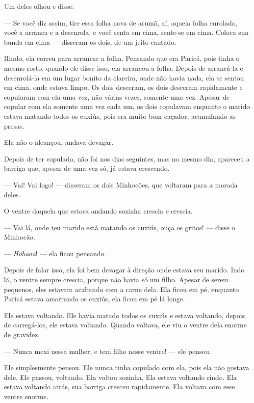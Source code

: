 Um deles olhou e disse: 

--- Se você diz assim, tire essa folha nova de arumã, aí, aquela folha
enrolada, você a arranca e a desenrola, e você senta em cima, sente-se
em cima. Coloca sua bunda em cima --- disseram os dois, de um jeito
cantado. 

Rindo, ela correu para arrancar a folha. Pensando que era Paricá, pois
 tinha o mesmo rosto, quando ele disse isso, ela arrancou a folha. Depois
 de arrancá-la e desenrolá-la em um lugar bonito da clareira, onde não
 havia nada, ela se sentou em cima, onde estava limpo. Os dois desceram,
 os dois desceram rapidamente e copularam com ela uma vez, não várias
 vezes, somente uma vez. Apesar de copular com ela somente uma vez cada um, os dois copulavam enquanto o marido estava matando todos os cuxiús,
 pois era muito bom caçador, acumulando as presas. 

Ela não o alcançou, andava devagar. 

Depois de ter copulado, não foi nos dias seguintes, mas no mesmo dia,
 apareceu a barriga que, apesar de uma vez só, já estava crescendo. 

--- Vai! Vai logo! --- disseram os dois Minhocões, que voltaram para a
morada deles. 

O ventre daquela que estava andando sozinha crescia e crescia. 

--- Vai lá, onde teu marido está matando os cuxiús, ouça os gritos! ---
disse o Minhocão. 

--- \textit{Hõhaaa}! --- ela ficou pensando.

Depois de falar isso, ela foi bem devagar à direção onde estava seu
marido. Indo lá, o ventre sempre crescia, porque não havia só um filho.
Apesar de serem pequenos, eles estavam acabando com a carne dela. Ela
ficou em pé, enquanto Paricá estava amarrando os cuxiús, ela ficou em pé
lá longe. 

Ele estava voltando. Ele havia matado todos os cuxiús e estava voltando,
depois de carregá-los, ele estava voltando. Quando voltava, ele viu o
ventre dela enorme de gravidez. 

--- Nunca mexi nessa mulher, e tem filho nesse ventre! --- ele pensou.

Ele simplesmente pensou. Ele nunca tinha copulado com ela, pois ela não
 gostava dele. Ele passou, voltando. Ela voltou sozinha. Ela estava
 voltando rindo. Ela estava voltando atrás, sua barriga cresceu
 rapidamente. Ela voltava com esse ventre enorme.

